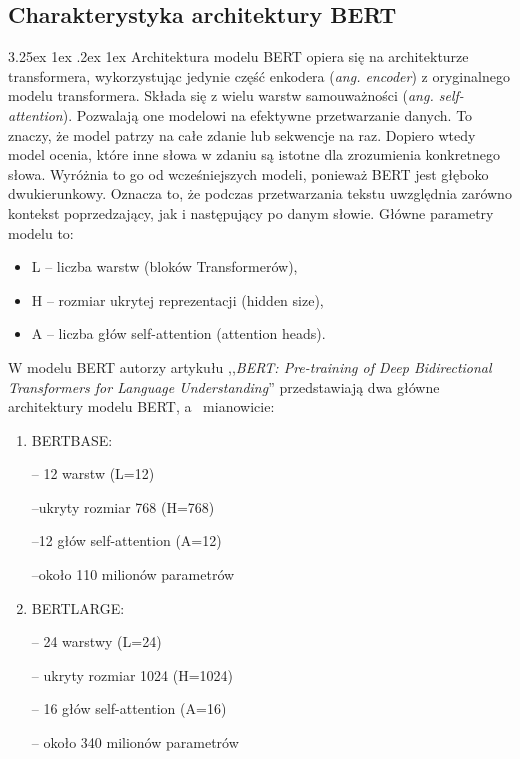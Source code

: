 \documentclass[wmii, inf, mgr]{uwmthesis}
\makeatletter
\renewcommand\paragraph{\@startsection{paragraph}{4}{\z@}%
  {3.25ex \@plus1ex \@minus.2ex}%
  {1ex}%
  {\normalfont\normalsize\bfseries}}
\makeatother
\begin{document}
\subsection{Charakterystyka architektury BERT}
\paragraph{Architektura modelu}
BERT opiera się na architekturze transformera, wykorzystując jedynie część enkodera (\textit{ang. encoder}) z oryginalnego modelu transformera. Składa się z wielu warstw samouważności (\textit{ang. self-attention}). Pozwalają one modelowi na efektywne przetwarzanie danych. To znaczy, że model patrzy na całe zdanie lub sekwencje na raz. Dopiero wtedy model ocenia, które inne słowa w zdaniu są istotne dla zrozumienia konkretnego słowa. Wyróżnia to go od wcześniejszych modeli, ponieważ BERT jest głęboko dwukierunkowy. Oznacza to, że podczas przetwarzania tekstu uwzględnia zarówno kontekst poprzedzający, jak i następujący po danym słowie. Główne parametry modelu to:

\begin{itemize}
\item {L} -- liczba warstw (bloków Transformerów),
\item {H} -- rozmiar ukrytej reprezentacji (hidden size),
\item {A} -- liczba głów self-attention (attention heads).
\end{itemize}

W modelu BERT autorzy artykułu ,,\textit{BERT: Pre-training of Deep Bidirectional Transformers for Language Understanding}'' \cite{BERT} przedstawiają dwa główne architektury modelu BERT, a~ mianowicie:

\begin{enumerate}
    \item BERTBASE:

    -- 12 warstw (L=12)

    --ukryty rozmiar 768 (H=768)

    --12 głów self-attention (A=12)

    --około 110 milionów parametrów

    \item BERTLARGE:
    
    -- 24 warstwy (L=24)
    
    -- ukryty rozmiar 1024 (H=1024)
    
    -- 16 głów self-attention (A=16)
    
    -- około 340 milionów parametrów
\end{enumerate}
\end{document}
